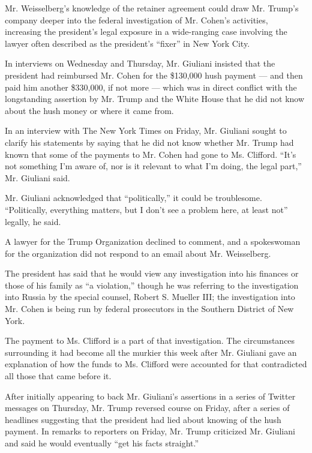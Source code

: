 Mr. Weisselberg's knowledge of the retainer agreement could draw Mr.
Trump's company deeper into the federal investigation of Mr. Cohen's
activities, increasing the president's legal exposure in a wide-ranging
case involving the lawyer often described as the president's ``fixer''
in New York City.

In interviews on Wednesday and Thursday, Mr. Giuliani insisted that the
president had reimbursed Mr. Cohen for the \$130,000 hush payment ---
and then paid him another \$330,000, if not more --- which was in direct
conflict with the longstanding assertion by Mr. Trump and the White
House that he did not know about the hush money or where it came from.

In an interview with The New York Times on Friday, Mr. Giuliani sought
to clarify his statements by saying that he did not know whether Mr.
Trump had known that some of the payments to Mr. Cohen had gone to Ms.
Clifford. ``It's not something I'm aware of, nor is it relevant to what
I'm doing, the legal part,'' Mr. Giuliani said.

Mr. Giuliani acknowledged that ``politically,'' it could be troublesome.
``Politically, everything matters, but I don't see a problem here, at
least not'' legally, he said.

A lawyer for the Trump Organization declined to comment, and a
spokeswoman for the organization did not respond to an email about Mr.
Weisselberg.

The president has said that he would view any investigation into his
finances or those of his family as ``a violation,'' though he was
referring to the investigation into Russia by the special counsel,
Robert S. Mueller III; the investigation into Mr. Cohen is being run by
federal prosecutors in the Southern District of New York.

The payment to Ms. Clifford is a part of that investigation. The
circumstances surrounding it had become all the murkier this week after
Mr. Giuliani gave an explanation of how the funds to Ms. Clifford were
accounted for that contradicted all those that came before it.

After initially appearing to back Mr. Giuliani's assertions in a series
of Twitter messages on Thursday, Mr. Trump reversed course on Friday,
after a series of headlines suggesting that the president had lied about
knowing of the hush payment. In remarks to reporters on Friday, Mr.
Trump criticized Mr. Giuliani and said he would eventually ``get his
facts straight.''

